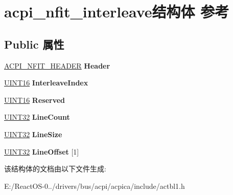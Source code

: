 \hypertarget{structacpi__nfit__interleave}{}\section{acpi\+\_\+nfit\+\_\+interleave结构体 参考}
\label{structacpi__nfit__interleave}
\subsection*{Public 属性}
\begin{DoxyCompactItemize}
\item 
\mbox{\label{structacpi__nfit__interleave_a3ab03762749d7f4d0525444976eafa21}} 
\hyperlink{structacpi__nfit__header}{A\+C\+P\+I\+\_\+\+N\+F\+I\+T\+\_\+\+H\+E\+A\+D\+ER} {\bfseries Header}
\item 
\mbox{\label{structacpi__nfit__interleave_a4a722afcef1d4621f426912023544e87}} 
\hyperlink{_processor_bind_8h_a09f1a1fb2293e33483cc8d44aefb1eb1}{U\+I\+N\+T16} {\bfseries Interleave\+Index}
\item 
\mbox{\label{structacpi__nfit__interleave_adac12a2d9c38b1ef149396fd10c5b585}} 
\hyperlink{_processor_bind_8h_a09f1a1fb2293e33483cc8d44aefb1eb1}{U\+I\+N\+T16} {\bfseries Reserved}
\item 
\mbox{\label{structacpi__nfit__interleave_a5d1c3c93ea3cba4e3873a1ef8cf52290}} 
\hyperlink{_processor_bind_8h_ae1e6edbbc26d6fbc71a90190d0266018}{U\+I\+N\+T32} {\bfseries Line\+Count}
\item 
\mbox{\label{structacpi__nfit__interleave_ae7cfd9d9212b5710fb68202953e4822f}} 
\hyperlink{_processor_bind_8h_ae1e6edbbc26d6fbc71a90190d0266018}{U\+I\+N\+T32} {\bfseries Line\+Size}
\item 
\mbox{\label{structacpi__nfit__interleave_a9f1e1c3a4b60714b5fd02d2a2997c88a}} 
\hyperlink{_processor_bind_8h_ae1e6edbbc26d6fbc71a90190d0266018}{U\+I\+N\+T32} {\bfseries Line\+Offset} \mbox{[}1\mbox{]}
\end{DoxyCompactItemize}


该结构体的文档由以下文件生成\+:\begin{DoxyCompactItemize}
\item 
E\+:/\+React\+O\+S-\/0../drivers/bus/acpi/acpica/include/actbl1.\+h\end{DoxyCompactItemize}
